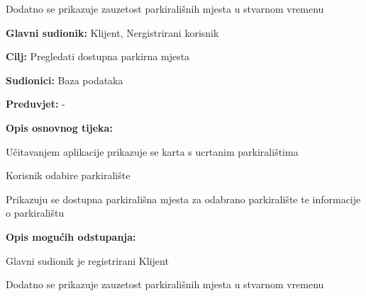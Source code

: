 \begin{packed_item}
\begin{packed_item}
\begin{packed_item}
\begin{packed_item}
\begin{packed_enum}
								\item Dodatno se prikazuje zauzetost parkirališnih mjesta u stvarnom vremenu
								
								
							\end{packed_enum}
	
							
						\end{packed_item}	
					\end{packed_item}

                        \noindent {}
					\begin{packed_item}
	
						\item \textbf{Glavni sudionik: }Klijent, Nergistrirani korisnik
						\item  \textbf{Cilj:} Pregledati dostupna parkirna mjesta
						\item  \textbf{Sudionici:} Baza podataka
						\item  \textbf{Preduvjet:} -
						\item  \textbf{Opis osnovnog tijeka:}
						
						\item[] \begin{packed_enum}
	
							\item Učitavanjem aplikacije prikazuje se karta s ucrtanim parkiralištima
							\item Korisnik odabire parkiralište
							\item Prikazuju se dostupna parkirališna mjesta za odabrano parkiralište te informacije o parkiralištu
							
						\end{packed_enum}

                            \item  \textbf{Opis mogućih odstupanja:}
						
						\item[] \begin{packed_item}
	
							\item[3.a] Glavni sudionik je registrirani Klijent
							\item[] \begin{packed_enum}
								
								\item Dodatno se prikazuje zauzetost parkirališnih mjesta u stvarnom vremenu
								

\end{packed_enum}
\end{packed_item}
\end{packed_item}
\end{packed_item}
\end{packed_item}
